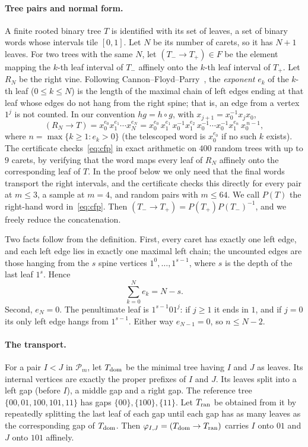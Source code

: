 \documentclass[11pt]{article}
\theoremstyle{definition}
\theoremstyle{remark}
\begin{document}
\paragraph{Tree pairs and normal form.}
A finite rooted binary tree $T$ is identified with its set of leaves, a set of binary words whose
intervals tile $[0,1]$. Let $N$ be its number of carets, so it has $N+1$ leaves. For two trees with
the same $N$, let $(T_-\to T_+)\in F$ be the element mapping the $k$-th leaf interval of $T_-$
affinely onto the $k$-th leaf interval of $T_+$. Let $R_N$ be the right vine. Following
Cannon--Floyd--Parry~\cite[\S2]{CFP}, the \emph{exponent} $e_k$ of the $k$-th leaf
($0\le k\le N$) is the length of the maximal chain of left edges ending at that leaf whose edges
do not hang from the right spine; that is, an edge from a vertex $1^j$ is not counted. In our
convention $hg=h\circ g$, with $x_{j+1}=x_0^{-1}x_jx_0$,
\begin{equation}\label{eq:cfp}
 (R_N\to T)=x_0^{e_0}x_1^{e_1}\cdots x_N^{e_N}
 = x_0^{e_0}\,x_1^{e_1}\,x_0^{-1}x_1^{e_2}\,x_0^{-1}\cdots x_0^{-1}x_1^{e_n}\,x_0^{\,n-1},
\end{equation}
where $n=\max\{k\ge1:e_k>0\}$ (the telescoped word is $x_0^{e_0}$ if no such $k$ exists). The certificate
checks~\eqref{eq:cfp} in exact arithmetic on $400$ random trees with up to $9$ carets, by verifying
that the word maps every leaf of $R_N$ affinely onto the corresponding leaf of $T$. In the
proof below we only need that the final words transport the right intervals, and the certificate
checks this directly for every pair at $m\le3$, a sample at $m=4$, and random pairs with
$m\le64$. We call $P(T)$ the right-hand word in~\eqref{eq:cfp}. Then
$(T_-\to T_+)=P(T_+)P(T_-)^{-1}$, and we freely reduce the concatenation.

Two facts follow from the definition. First, every caret has exactly one left edge, and each left
edge lies in exactly one maximal left chain; the uncounted edges are those hanging from the $s$
spine vertices $1^0,\dots,1^{s-1}$, where $s$ is the depth of the last leaf $1^s$. Hence
\begin{equation}\label{eq:sum}
  \textstyle\sum_{k=0}^Ne_k=N-s .
\end{equation}
Second, $e_N=0$. The penultimate leaf is $1^{s-1}01^j$: if $j\ge1$ it ends in $1$, and if $j=0$
its only left edge hangs from $1^{s-1}$. Either way $e_{N-1}=0$, so $n\le N-2$.

\paragraph{The transport.}
For a pair $I<J$ in $\mathcal P_m$, let $T_{\rm dom}$ be the minimal tree having $I$ and $J$ as
leaves. Its internal vertices are exactly the proper prefixes of $I$ and $J$. Its leaves split into
a left gap (before $I$), a middle gap and a right gap. The reference tree
$\{00,01,100,101,11\}$ has gaps $\{00\},\{100\},\{11\}$. Let $T_{\rm ran}$ be obtained from it by
repeatedly splitting the last leaf of each gap until each gap has as many leaves as the
corresponding gap of $T_{\rm dom}$. Then $\varphi_{I,J}=(T_{\rm dom}\to T_{\rm ran})$ carries $I$
onto $01$ and $J$ onto $101$ affinely.
\end{document}
